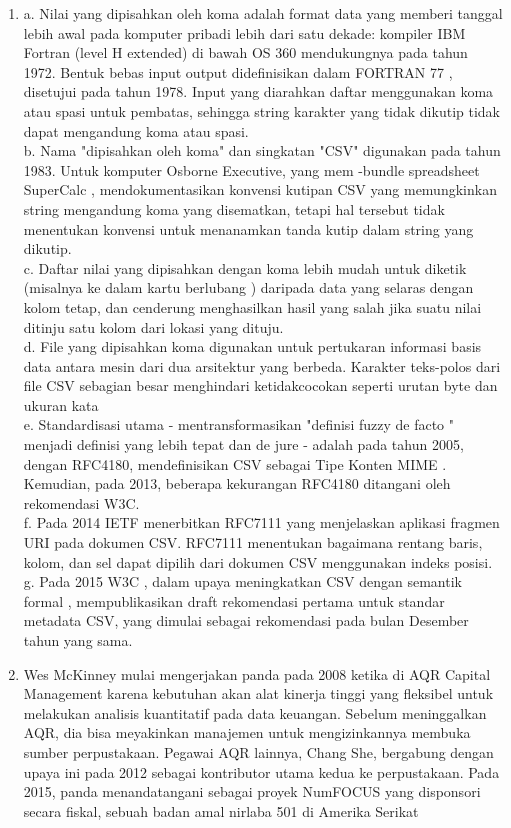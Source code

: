 \begin{enumerate}
\item
a. Nilai yang dipisahkan oleh koma adalah format data yang memberi tanggal lebih awal pada komputer pribadi lebih dari satu dekade: kompiler IBM Fortran (level H extended) di bawah OS  360 mendukungnya pada tahun 1972. Bentuk bebas input output didefinisikan dalam FORTRAN 77 , disetujui pada tahun 1978. 
Input yang diarahkan daftar menggunakan koma atau spasi untuk pembatas, sehingga string karakter yang tidak dikutip tidak dapat mengandung koma atau spasi.\\
b.	Nama "dipisahkan oleh koma" dan singkatan "CSV" digunakan pada tahun 1983. Untuk komputer Osborne Executive, yang mem -bundle spreadsheet SuperCalc , mendokumentasikan konvensi kutipan CSV yang memungkinkan string mengandung koma yang disematkan, tetapi hal tersebut tidak menentukan konvensi untuk menanamkan tanda kutip dalam string yang dikutip.\\
c.	Daftar nilai yang dipisahkan dengan koma lebih mudah untuk diketik (misalnya ke dalam kartu berlubang ) daripada data yang selaras dengan kolom tetap, dan cenderung menghasilkan hasil yang salah jika suatu nilai ditinju satu kolom dari lokasi yang dituju.\\
d.	File yang dipisahkan koma digunakan untuk pertukaran informasi basis data antara mesin dari dua arsitektur yang berbeda. Karakter teks-polos dari file CSV sebagian besar menghindari ketidakcocokan seperti urutan byte dan ukuran kata\\
e.	Standardisasi utama - mentransformasikan "definisi fuzzy de facto " menjadi definisi yang lebih tepat dan de jure - adalah pada tahun 2005, dengan RFC4180, mendefinisikan CSV sebagai Tipe Konten MIME . Kemudian, pada 2013, beberapa kekurangan RFC4180 ditangani oleh rekomendasi W3C.\\
f.	Pada 2014 IETF menerbitkan RFC7111 yang menjelaskan aplikasi fragmen URI pada dokumen CSV. RFC7111 menentukan bagaimana rentang baris, kolom, dan sel dapat dipilih dari dokumen CSV menggunakan indeks posisi.\\
g.	Pada 2015 W3C , dalam upaya meningkatkan CSV dengan semantik formal , mempublikasikan draft rekomendasi pertama untuk standar metadata CSV, yang dimulai sebagai rekomendasi pada bulan Desember tahun yang sama.\\

\item
Wes McKinney mulai mengerjakan panda pada 2008 ketika di AQR Capital Management karena kebutuhan akan alat kinerja tinggi yang fleksibel untuk melakukan analisis kuantitatif pada data keuangan. Sebelum meninggalkan AQR, dia bisa meyakinkan manajemen untuk mengizinkannya membuka sumber perpustakaan.
Pegawai AQR lainnya, Chang She, bergabung dengan upaya ini pada 2012 sebagai kontributor utama kedua ke perpustakaan.
Pada 2015, panda menandatangani sebagai proyek NumFOCUS yang disponsori secara fiskal, sebuah badan amal nirlaba 501 di Amerika Serikat


\end{enumerate}

